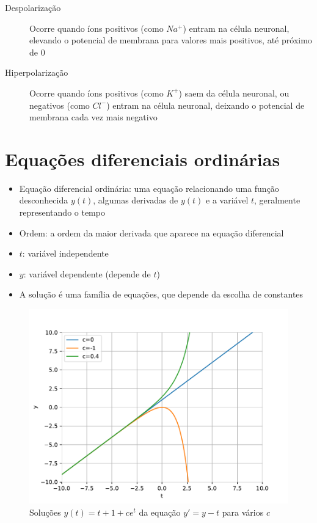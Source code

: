 \begin{description}
	\item[Despolarização] Ocorre quando íons positivos (como $Na^+$) entram na célula neuronal, elevando o potencial de membrana para valores mais positivos, até próximo de 0
	\item[Hiperpolarização] Ocorre quando íons positivos (como $K^+$) saem da célula neuronal, ou negativos (como $Cl^-$) entram na célula neuronal, deixando o potencial de membrana cada vez mais negativo
\end{description}

\section{Equações diferenciais ordinárias}\label{sec:eqdif}
\begin{itemize}
	\item Equação diferencial ordinária: uma equação relacionando uma função desconhecida $y(t)$, algumas derivadas de $y(t)$ e a variável $t$, geralmente representando o tempo \cite{adkins_ordinary_2012}
	\item Ordem: a ordem da maior derivada que aparece na equação diferencial
	\item $t$: variável independente
	\item $y$: variável dependente (depende de $t$)
	\item A solução é uma família de equações, que depende da escolha de constantes
\end{itemize}

\begin{figure}[htb!]
	\centering
	\caption{Soluções $y(t) = t + 1 + ce^t$ da equação $y'=y-t$ para vários $c$}
	\label{fig:solucao}
	\includegraphics[width=0.7\linewidth]{figs/solucao}
\end{figure}


